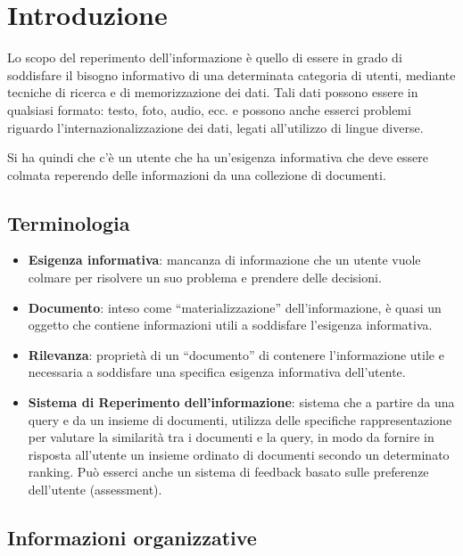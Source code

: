 

\chapter{Introduzione}

Lo scopo del reperimento dell'informazione è quello di essere in grado di soddisfare il bisogno informativo di una determinata categoria di utenti, mediante tecniche di ricerca e di memorizzazione dei dati.
Tali dati possono essere in qualsiasi formato: testo, foto, audio, ecc. e possono anche esserci problemi riguardo l'internazionalizzazione dei dati, legati all'utilizzo di lingue diverse.

Si ha quindi che c'è un utente che ha un'esigenza informativa che deve essere colmata reperendo delle informazioni da una collezione di documenti.

\section{Terminologia}

\begin{itemize}
	\item \textbf{Esigenza informativa}: mancanza di informazione che un utente vuole colmare per risolvere un suo problema e prendere delle decisioni.
	\item \textbf{Documento}: inteso come ``materializzazione'' dell'informazione, è quasi un oggetto che contiene informazioni utili a soddisfare l'esigenza informativa.
	\item \textbf{Rilevanza}: proprietà di un ``documento'' di contenere l'informazione utile e necessaria a soddisfare una specifica esigenza informativa dell'utente.
	\item \textbf{Sistema di Reperimento dell'informazione}: sistema che a partire da una query e da un insieme di documenti, utilizza delle specifiche rappresentazione per valutare la similarità tra i documenti e la query, in modo da fornire in risposta all'utente un insieme ordinato di documenti secondo un determinato ranking. Può esserci anche un sistema di feedback basato sulle preferenze dell'utente (assessment).
\end{itemize}


\section{Informazioni organizzative}


